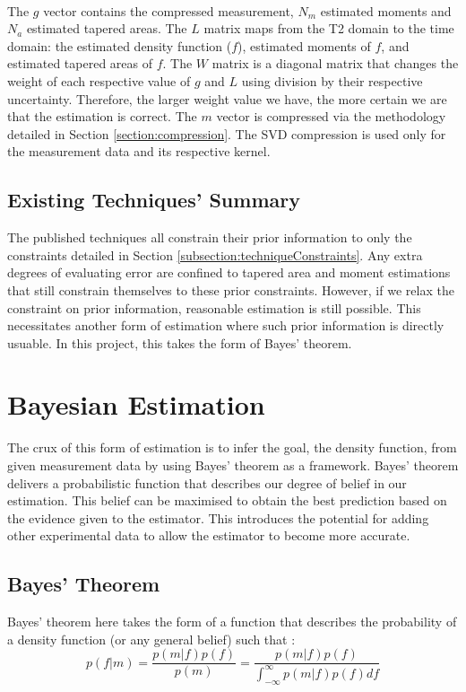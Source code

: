 \paragraph{}
    The $g$ vector contains the compressed measurement, $N_{m}$ estimated moments and $N_{a}$ estimated tapered areas. The $L$ matrix maps from the T2 domain to the time domain: the estimated density function ($f$), estimated moments of $f$, and estimated tapered areas of $f$. The $W$ matrix is a diagonal matrix that changes the weight of each respective value of $g$ and $L$ using division by their respective uncertainty. Therefore, the larger weight value we have, the more certain we are that the estimation is correct. The $m$ vector is compressed via the methodology detailed in Section \ref{section:compression}. The SVD compression is used only for the measurement data and its respective kernel. 


\subsection{Existing Techniques' Summary}
The published techniques all constrain their prior information to only the constraints detailed in Section \ref{subsection:techniqueConstraints}. Any extra degrees of evaluating error are confined to tapered area and moment estimations that still constrain themselves to these prior constraints. However, if we relax the constraint on prior information, reasonable estimation is still possible. This necessitates another form of estimation where such prior information is directly usuable. In this project, this takes the form of Bayes' theorem.

\section{Bayesian Estimation}

The crux of this form of estimation is to infer the goal, the density function, from given measurement data by using Bayes' theorem as a framework. Bayes' theorem delivers a probabilistic function that describes our degree of belief in our estimation. This belief can be maximised to obtain the best prediction based on the evidence given to the estimator. This introduces the potential for adding other experimental data to allow the estimator to become more accurate.

\subsection{Bayes' Theorem}
Bayes' theorem here takes the form of a function that describes the probability of a density function (or any general belief) such that \cite{DiscreteRandomSignalsBook}:
\begin{equation}
    p(f|m) = \frac{p(m|f)p(f)}{p(m)}
    = \frac{p(m|f)p(f)}
    {\int^\infty_{-\infty} p(m|f)p(f) df}
 \label{eq:BayesThm}  
\end{equation}

